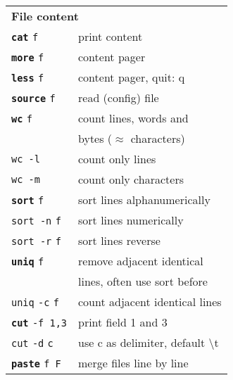 \documentclass[a4paper,10pt,landscape]{report}
\newcommand{\boxtitle}[1]{{\textbf{\color{RubineRed}#1}}}
\newcommand{\labbr}[1]{{\texttt{\color{Red}#1}}}
\newcommand{\rabbr}[1]{{\color{Red}#1}}
\newcommand{\co}[1]{\texttt{#1}}
\newcommand{\cob}[1]{\texttt{\textbf{#1}}} %
\begin{document}
\begin{multicols}{4}
\begin{mdframed}[style=mybox]
\begin{tabular}{ l l }
\multicolumn{2}{l}{\boxtitle{File content}} \\
\cob{cat} \labbr{f}                 & print content \\
\cob{more} \labbr{f}                & content pager \\
\cob{less} \labbr{f}                & content pager, quit: q\\
\cob{source} \labbr{f}              & read (config) file\\
\cob{wc} \labbr{f}                  & count lines, words and \\
                                 & bytes ($\approx$ characters) \\
\co{wc -l}                       & count only lines\\
\co{wc -m}                       & count only characters \\
\cob{sort} \labbr{f}                & sort lines alphanumerically \\
\co{sort -n} \labbr{f}              & sort lines numerically \\
\co{sort -r} \labbr{f}              & sort lines reverse \\
\cob{uniq} \labbr{f}                & remove adjacent identical \\
                                 & lines, often use sort before \\
\co{uniq} \co{-c} \labbr{f}         & count adjacent identical lines \\
\cob{cut} \co{-f 1,3}            & print field 1 and 3 \\
\co{cut} \co{-d} \labbr{c}          & use \rabbr{c} as delimiter, default \rabbr{\textbackslash{}t} \\
\cob{paste} \labbr{f F}             & merge files line by line \\
\end{tabular}
\end{mdframed}


\end{multicols}
\end{document}
